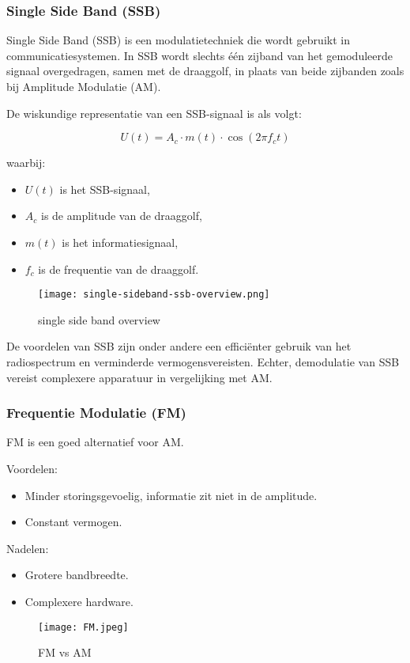\subsubsection{Single Side Band (SSB)}
Single Side Band (SSB) is een modulatietechniek die wordt gebruikt in communicatiesystemen. In SSB wordt slechts één zijband van het gemoduleerde signaal overgedragen, samen met de draaggolf, in plaats van beide zijbanden zoals bij Amplitude Modulatie (AM).

De wiskundige representatie van een SSB-signaal is als volgt:

\[ U(t) = A_c \cdot m(t) \cdot \cos(2\pi f_c t) \]

waarbij:
\begin{itemize}
  \item \(U(t)\) is het SSB-signaal,
  \item \(A_c\) is de amplitude van de draaggolf,
  \item \(m(t)\) is het informatiesignaal,
  \item \(f_c\) is de frequentie van de draaggolf.
\end{itemize}

\begin{figure}[H]
\centering
\texttt{[image: single-sideband-ssb-overview.png]}
\caption{single side band overview}
\end{figure}

De voordelen van SSB zijn onder andere een efficiënter gebruik van het radiospectrum en verminderde vermogensvereisten. Echter, demodulatie van SSB vereist complexere apparatuur in vergelijking met AM.

\subsubsection{Frequentie Modulatie (FM)}
FM is een goed alternatief voor AM.

Voordelen:
\begin{itemize}
  \item Minder storingsgevoelig, informatie zit niet in de amplitude.
  \item Constant vermogen.
\end{itemize}

Nadelen:
\begin{itemize}
  \item Grotere bandbreedte.
  \item Complexere hardware.
\end{itemize}

\begin{figure}[H]
\centering
\texttt{[image: FM.jpeg]}
\caption{FM vs AM}
\end{figure}
    